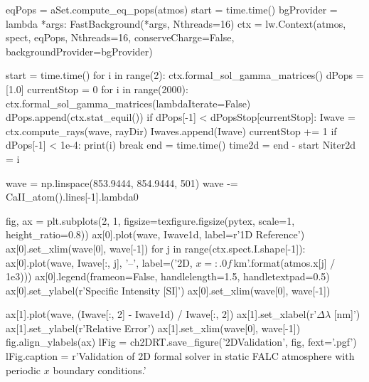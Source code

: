 \begin{pycode}[2DValidation]
eqPops = aSet.compute_eq_pops(atmos)
start = time.time()
bgProvider = lambda *args: FastBackground(*args, Nthreads=16)
ctx = lw.Context(atmos, spect, eqPops, Nthreads=16, conserveCharge=False, backgroundProvider=bgProvider)

start = time.time()
for i in range(2):
    ctx.formal_sol_gamma_matrices()
dPops = [1.0]
currentStop = 0
for i in range(2000):
    ctx.formal_sol_gamma_matrices(lambdaIterate=False)
    dPops.append(ctx.stat_equil())
    if dPops[-1] < dPopsStop[currentStop]:
        Iwave = ctx.compute_rays(wave, rayDir)
        Iwaves.append(Iwave)
        currentStop += 1
    if dPops[-1] < 1e-4:
        print(i)
        break
end = time.time()
time2d = end - start
Niter2d = i

wave = np.linspace(853.9444, 854.9444, 501)
wave -= CaII_atom().lines[-1].lambda0
\end{pycode}

\begin{pycode}[2DValidation]
fig, ax = plt.subplots(2, 1, figsize=texfigure.figsize(pytex, scale=1, height_ratio=0.8))
ax[0].plot(wave, Iwave1d, label=r'1D Reference')
ax[0].set_xlim(wave[0], wave[-1])
for j in range(ctx.spect.I.shape[-1]):
    ax[0].plot(wave, Iwave[:, j], '--', label=('2D, $x={:.0f}$\,\si{{\kilo\metre}}'.format(atmos.x[j] / 1e3)))
ax[0].legend(frameon=False, handlelength=1.5, handletextpad=0.5)
ax[0].set_ylabel(r'Specific Intensity [SI]')
ax[0].set_xlim(wave[0], wave[-1])

ax[1].plot(wave, (Iwave[:, 2] - Iwave1d) / Iwave[:, 2])
ax[1].set_xlabel(r'$\Delta\lambda$ [\si{\nano\metre}]')
ax[1].set_ylabel(r'Relative Error')
ax[1].set_xlim(wave[0], wave[-1])
fig.align_ylabels(ax)
lFig = ch2DRT.save_figure('2DValidation', fig, fext='.pgf')
lFig.caption = r'Validation of 2D formal solver in static FALC atmosphere with periodic $x$ boundary conditions.'
\end{pycode}

